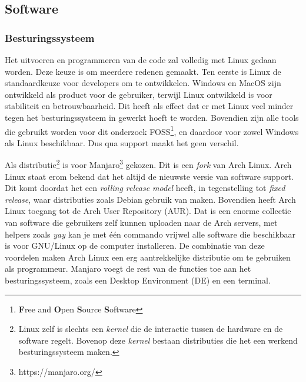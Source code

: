 \documentclass[12pt, a4paper]{article}
\begin{document}
\subsection{Software}
\subsubsection{Besturingssysteem}
Het uitvoeren en programmeren van de code zal volledig met Linux gedaan worden. Deze keuze is om meerdere redenen gemaakt. Ten eerste is Linux de standaardkeuze voor developers om te ontwikkelen. Windows en MacOS zijn ontwikkeld als product voor de gebruiker, terwijl Linux ontwikkeld is voor stabiliteit en betrouwbaarheid. Dit heeft als effect dat er met Linux veel minder tegen het besturingssysteem in gewerkt hoeft te worden. Bovendien zijn alle tools die gebruikt worden voor dit onderzoek FOSS\footnote{\textbf{F}ree and \textbf{O}pen \textbf{S}ource \textbf{S}oftware}, en daardoor voor zowel Windows als Linux beschikbaar. Dus qua support maakt het geen verschil.

Als distributie\footnote{Linux zelf is slechts een \emph{kernel} die de interactie tussen de hardware en de software regelt. Bovenop deze \emph{kernel} bestaan distributies die het een werkend besturingssysteem maken.} is voor Manjaro\footnote{https://manjaro.org/} gekozen. Dit is een \textit{fork} van Arch Linux. Arch Linux staat erom bekend dat het altijd de nieuwste versie van software support. Dit komt doordat het een \emph{rolling release model} heeft, in tegenstelling tot \emph{fixed release}, waar distributies zoals Debian gebruik van maken. Bovendien heeft Arch Linux toegang tot de Arch User Repository (AUR). Dat is een enorme collectie van software die gebruikers zelf kunnen uploaden naar de Arch servers, met helpers zoals \emph{yay} kan je met één commando vrijwel alle software die beschikbaar is voor GNU/Linux op de computer installeren. De combinatie van deze voordelen maken Arch Linux een erg aantrekkelijke distributie om te gebruiken als programmeur. Manjaro voegt de rest van de functies toe aan het besturingssysteem, zoals een Desktop Environment (DE) en een terminal.
\end{document}
